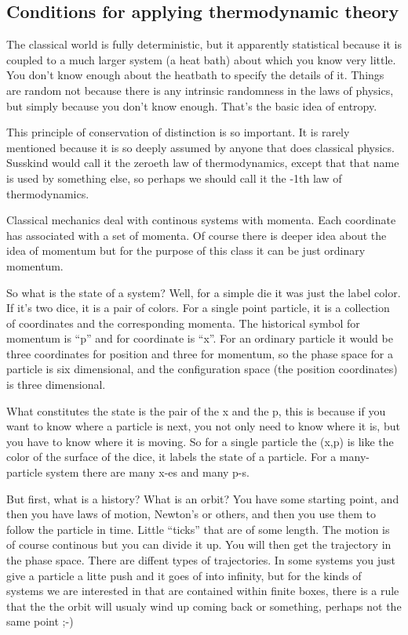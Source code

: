 \documentclass[a4, 12pt, english, USenglish]{scrreprt}
\begin{document}
\subsection{Conditions for applying thermodynamic theory}

The classical world is fully deterministic, but it apparently
statistical because it is coupled to a much larger system (a heat
bath) about which you know very little.  You don't know enough about
the heatbath to specify the details of it.  Things are random not
because there is any intrinsic randomness in the laws of physics, but
simply because you don't know enough.  That's the basic idea of
entropy.

This principle of conservation of distinction is so important. It is
rarely mentioned because it is so deeply assumed by anyone that does
classical physics. Susskind would call it the zeroeth law of
thermodynamics, except that that name is used by something else, so
perhaps we should call it the -1th law of thermodynamics.

Classical mechanics deal with continous systems with momenta.  Each
coordinate has associated with a set of momenta.  Of course there is
deeper idea about the idea of momentum but for the purpose of this
class it can be just ordinary momentum.

So what is the state of a system? Well, for a simple die it was just
the label color.  If it's two dice, it is a pair of colors.  For a
single point particle, it is  a collection of coordinates and the
corresponding momenta.  The historical symbol for momentum is ``p''
and for coordinate is ``x''.  For an ordinary particle it would be
three coordinates for position and three for momentum, so the phase
space for a particle is six dimensional, and the configuration space
(the position coordinates) is three dimensional.

What constitutes  the state is the pair of the x and the p, this is
because if you want to know where a particle is next, you not only
need to know where it is, but you have to know where it is moving.
So for a single particle the (x,p) is like the color of the surface of
the dice, it labels the state of a particle.  For a many-particle
system there are many x-es and many p-s.

But first, what is a history? What is an orbit?  You have some
starting point, and then you have laws of motion, Newton's or others,
and then you use them to follow the particle in time.  Little
``ticks'' that are of some length.  The motion is of course continous
but you can divide it up.  You will then get the trajectory in the
phase space.   There are diffent types of trajectories.  In some
systems you just give a particle a litte push and it goes of into
infinity, but for the kinds of systems we are interested in that are
contained within finite boxes, there is a rule that the the orbit will
usualy wind up coming back or something, perhaps not the same point ;-)
\end{document}
